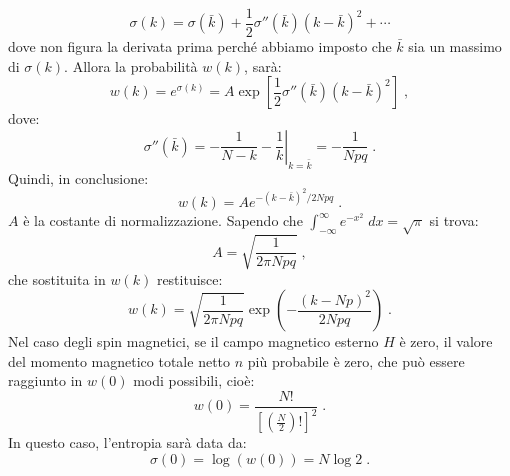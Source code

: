 \begin{equation}
\sigma(k)=\sigma(\bar{k})+\frac{1}{2}\sigma''(\bar{k})(k-\bar{k})^2+\cdots
\end{equation}
dove non figura la derivata prima perché abbiamo imposto che $\bar{k}$ sia un massimo di $\sigma(k)$. Allora la probabilità $w(k)$, sarà:
\begin{equation}
w(k)=e^{\sigma(k)}=A\exp\left[\frac{1}{2}\sigma''(\bar{k})(k-\bar{k})^2\right]\;,
\end{equation}
dove:
\begin{equation}
\sigma''(\bar{k})=\left. -\frac{1}{N-k}-\frac{1}{k}\right|_{k=\bar{k}}=-\frac{1}{Npq}\;.
\end{equation}
Quindi, in conclusione:
\begin{equation}
w(k)=Ae^{-{(k-\bar{k})^2/2Npq}}\;.
\end{equation}
$A$ è la costante di normalizzazione. Sapendo che $\int_{-\infty}^{\infty} e^{-x^2}\;dx=\sqrt{\pi}$ si trova:
\begin{equation}
A=\sqrt{\frac{1}{2\pi Npq}}\;,
\end{equation}
che sostituita in $w(k)$ restituisce:
\begin{equation}
w(k)=\sqrt{\frac{1}{2\pi Npq}}\exp\left(-\frac{(k-Np)^2}{2Npq}\right)\;.
\end{equation}
Nel caso degli spin magnetici, se il campo magnetico esterno $H$ è zero, il valore del momento magnetico totale netto $n$ più probabile è zero, che può essere raggiunto in $w(0)$ modi possibili, cioè:
\begin{equation}
w(0)=\frac{N!}{\left[\left(\frac{N}{2}\right)!\right]^2}\;.
\end{equation}
In questo caso, l'entropia sarà data da:
\begin{equation}
\sigma(0)=\log(w(0))=N\log 2\;.
\end{equation}
\pagebreak
